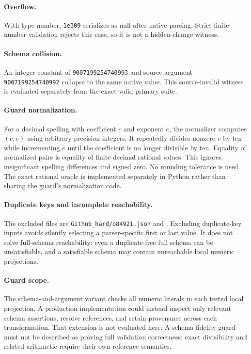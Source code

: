 \documentclass[11pt]{article}
\begin{document}
\paragraph{Overflow.}
With type number, \texttt{1e309} serializes as null after native parsing. Strict finite-number validation rejects this case, so it is not a hidden-change witness.
\paragraph{Schema collision.}
An integer constant of \texttt{9007199254740993} and source argument \texttt{9007199254740992} collapse to the same native value. This source-invalid witness is evaluated separately from the exact-valid primary suite.


\paragraph{Guard normalization.}
For a decimal spelling with coefficient $c$ and exponent $e$, the normalizer computes $(c,e)$ using arbitrary-precision integers. It repeatedly divides nonzero $c$ by ten while incrementing $e$ until the coefficient is no longer divisible by ten. Equality of normalized pairs is equality of finite decimal rational values. This ignores insignificant spelling differences and signed zero. No rounding tolerance is used. The exact rational oracle is implemented separately in Python rather than sharing the guard's normalization code.

\paragraph{Duplicate keys and incomplete reachability.}
The excluded files are \texttt{Github\_hard/o84921.json} and . Excluding duplicate-key inputs avoids silently selecting a parser-specific first or last value. It does not solve full-schema reachability: even a duplicate-free full schema can be unsatisfiable, and a satisfiable schema may contain unreachable local numeric projections.

\paragraph{Guard scope.}
The schema-and-argument variant checks all numeric literals in each tested local projection. A production implementation could instead inspect only relevant schema assertions, resolve references, and retain provenance across each transformation. That extension is not evaluated here. A schema-fidelity guard must not be described as proving full validation correctness: exact divisibility and related arithmetic require their own reference semantics.
\end{document}
